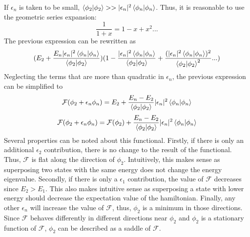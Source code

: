\begin{sol}
\begin{enumerate}[label=\textbf{(\alph*)}]
\begin{equation}
\end{equation} If $\epsilon_n$ is taken to be small, $\braket{\phi_2}{\phi_2}>>|\epsilon_n|^2\braket{\phi_n}{\phi_n}$. Thus, it is reasonable to use the geometric series expansion:
\begin{equation}
	\frac{1}{1+x}= 1-x+x^2...
\end{equation} The previous expression can be rewritten as
\begin{equation}
	(E_2+\frac{E_n|\epsilon_n|^2\braket{\phi_n}{\phi_n}}{\braket{\phi_2}{\phi_2}})(1-\frac{|\epsilon_n|^2\braket{\phi_n}{\phi_n}}{\braket{\phi_2}{\phi_2}}+\frac{(|\epsilon_n|^2\braket{\phi_n}{\phi_n})^2}{\braket{\phi_2}{\phi_2}^2}...)
\end{equation} 
Neglecting the terms that are more than quadratic in $\epsilon_n$, the previous expression can be simplified to
\begin{equation}
	\mathcal{F}(\phi_2+\epsilon_n\phi_n)=E_2+\frac{E_n-E_2}{\braket{\phi_2}{\phi_2}}|\epsilon_n|^2\braket{\phi_n}{\phi_n}
\end{equation}
\begin{equation}
	\mathcal{F}(\phi_2+\epsilon_n\phi_n)=\mathcal{F}(\phi_2)+\frac{E_n-E_2}{\braket{\phi_2}{\phi_2}}|\epsilon_n|^2\braket{\phi_n}{\phi_n}
\end{equation}
Several properties can be noted about this functional. Firstly, if there is only an additional $\epsilon_2$ contribution, there is no change to the result of the functional. Thus, $\mathcal{F}$ is flat along the direction of $\phi_2$. Intuitively, this makes sense as superposing two states with the same energy does not change the energy eigenvalue. Secondly, if there is only a $\epsilon_1$ contribution, the value of $\mathcal{F}$ decreases since $E_2>E_1$. This also makes intuitive sense as superposing a state with lower energy should decrease the expectation value of the hamiltonian. Finally, any other $\epsilon_n$ will increase the value of $\mathcal{F}$, thus, $\phi_2$ is a minimum in those directions. Since $\mathcal{F}$ behaves differently in different directions near $\phi_2$ and $\phi_2$ is a stationary function of $\mathcal{F}$, $\phi_2$ can be described as a saddle of $\mathcal{F}$.
\end{enumerate}
\end{sol}